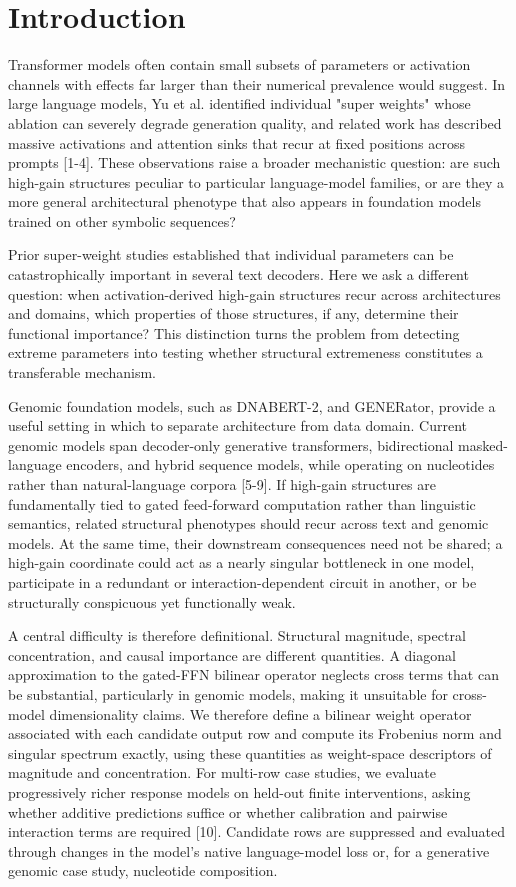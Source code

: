 \documentclass[11pt]{article}
\begin{document}
\section*{Introduction}
Transformer models often contain small subsets of parameters or activation channels with effects far larger than their numerical prevalence would suggest. In large language models, Yu et al. identified individual "super weights" whose ablation can severely degrade generation quality, and related work has described massive activations and attention sinks that recur at fixed positions across prompts [1-4]. These observations raise a broader mechanistic question: are such high-gain structures peculiar to particular language-model families, or are they a more general architectural phenotype that also appears in foundation models trained on other symbolic sequences?

Prior super-weight studies established that individual parameters can be catastrophically important in several text decoders. Here we ask a different question: when activation-derived high-gain structures recur across architectures and domains, which properties of those structures, if any, determine their functional importance? This distinction turns the problem from detecting extreme parameters into testing whether structural extremeness constitutes a transferable mechanism.

Genomic foundation models, such as DNABERT-2, and GENERator, provide a useful setting in which to separate architecture from data domain. Current genomic models span decoder-only generative transformers, bidirectional masked-language encoders, and hybrid sequence models, while operating on nucleotides rather than natural-language corpora [5-9]. If high-gain structures are fundamentally tied to gated feed-forward computation rather than linguistic semantics, related structural phenotypes should recur across text and genomic models. At the same time, their downstream consequences need not be shared; a high-gain coordinate could act as a nearly singular bottleneck in one model, participate in a redundant or interaction-dependent circuit in another, or be structurally conspicuous yet functionally weak.

A central difficulty is therefore definitional. Structural magnitude, spectral concentration, and causal importance are different quantities. A diagonal approximation to the gated-FFN bilinear operator neglects cross terms that can be substantial, particularly in genomic models, making it unsuitable for cross-model dimensionality claims. We therefore define a bilinear weight operator associated with each candidate output row and compute its Frobenius norm and singular spectrum exactly, using these quantities as weight-space descriptors of magnitude and concentration. For multi-row case studies, we evaluate progressively richer response models on held-out finite interventions, asking whether additive predictions suffice or whether calibration and pairwise interaction terms are required [10]. Candidate rows are suppressed and evaluated through changes in the model's native language-model loss or, for a generative genomic case study, nucleotide composition.
\end{document}
